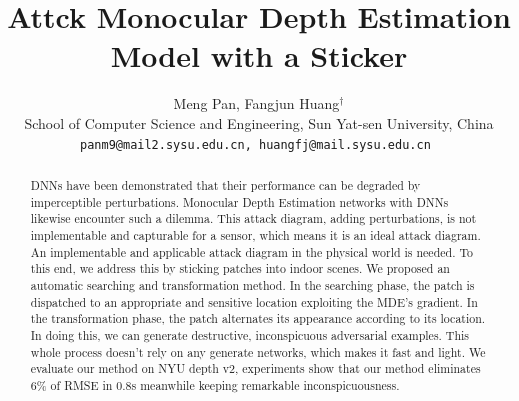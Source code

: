 \documentclass[10pt,twocolumn,letterpaper]{article}
\begin{document}
\title{Attck Monocular Depth Estimation Model with a Sticker}

\author{Meng Pan, Fangjun Huang$^\dagger$\\
 School of Computer Science and Engineering, 
Sun Yat-sen University, China\\
{\tt\small panm9@mail2.sysu.edu.cn, huangfj@mail.sysu.edu.cn
}}
\maketitle
\def\thefootnote{$\dagger$}\def\thefootnote{\arabic{footnote}}

\begin{abstract}
	DNNs have been demonstrated that their performance 
	can be degraded by imperceptible perturbations. 
	Monocular Depth Estimation networks with 
	DNNs likewise encounter such a dilemma. 
	This attack diagram, adding perturbations, 
	is not implementable and capturable for a sensor, 
	which means it is an ideal attack diagram. 
	An implementable and applicable attack diagram in 
	the physical world is needed. To this end, we 
	address this by sticking patches into indoor scenes. 
	We proposed an automatic searching and 
	transformation method. In the searching phase, 
	the patch is dispatched to an appropriate and 
	sensitive location exploiting the MDE's gradient. 
	In the transformation phase, the patch alternates 
	its appearance according to its location. 
	In doing this, we can generate destructive, 
	inconspicuous adversarial examples. 
	This whole process doesn't rely on any generate
	networks, which makes it fast and light.
	We evaluate our method on NYU depth v2, 
	experiments show that our method 
	eliminates 6\% of RMSE in 0.8s 
	meanwhile 
	keeping remarkable inconspicuousness.
\end{abstract}
\end{document}
